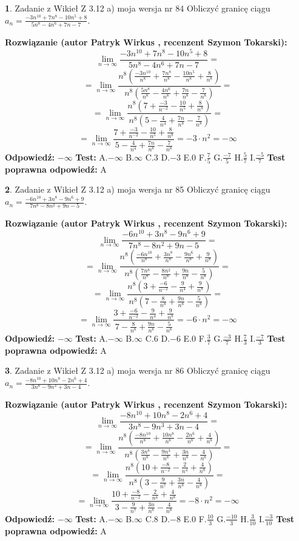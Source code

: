 \documentclass[12pt, a4paper]{article}
\theoremstyle{definition} %
\newtheorem{zad}{}
\newcommand{\zadStart}[1]{\begin{zad}#1\newline}
\newcommand{\zadStop}{\end{zad}}
\newcommand{\rozwStart}[2]{\noindent \textbf{Rozwiązanie (autor #1 , recenzent #2): }\newline}
\newcommand{\rozwStop}{\newline}
\newcommand{\odpStart}{\noindent \textbf{Odpowiedź:}\newline}
\newcommand{\odpStop}{\newline}
\newcommand{\testStart}{\noindent \textbf{Test:}\newline}
\newcommand{\testStop}{\newline}
\newcommand{\kluczStart}{\noindent \textbf{Test poprawna odpowiedź:}\newline}
\newcommand{\kluczStop}{\newline}
\begin{document}
\zadStart{Zadanie z Wikieł Z 3.12 a) moja wersja nr 84}
Obliczyć granicę ciągu $a_{n}=\frac{-3n^{10}+7n^{8}-10n^{5}+8}{5n^{8}-4n^{6}+7n-7}$.
\zadStop
\rozwStart{Patryk Wirkus}{Szymon Tokarski}
$$\lim\limits_{n\to\infty}\frac{-3n^{10}+7n^{8}-10n^{5}+8}{5n^{8}-4n^{6}+7n-7}=$$
$$=\lim\limits_{n\to\infty}\frac{n^{8}\left(\frac{-3n^{10}}{n^{8}}+\frac{7n^{8}}{n^{8}}-\frac{10n^{5}}{n^{8}}+\frac{8}{n^{8}}\right)}{n^{8}\left(\frac{5n^{8}}{n^{8}}-\frac{4n^{6}}{n^{8}}+\frac{7n}{n^{8}}-\frac{7}{n^{8}}\right)}=$$
$$=\lim\limits_{n\to\infty}\frac{n^{8}\left(7+\frac{-3}{n^{-2}}-\frac{10}{n^{5}}+\frac{8}{n^{8}}\right)}
{n^{8}\left(5-\frac{4}{n^{4}}+\frac{7n}{n^{8}}-\frac{7}{n^{8}}\right)}=$$
$$=\lim\limits_{n\to\infty}\frac{7+\frac{-3}{n^{-2}}-\frac{10}{n^{5}}+\frac{8}{n^{8}}}{5-\frac{4}{n^{4}}+\frac{7n}{n^{8}}-\frac{7}{n^{8}}}=-3\cdot n^{2} = -\infty$$
\rozwStop
\odpStart
$-\infty$
\odpStop
\testStart
A.$-\infty$
B.$\infty$
C.$3$
D.$-3$
E.$0$
F.$\frac{7}{5}$
G.$\frac{-7}{5}$
H.$\frac{5}{7}$
I.$\frac{-5}{7}$
\testStop
\kluczStart
A
\kluczStop



\zadStart{Zadanie z Wikieł Z 3.12 a) moja wersja nr 85}
Obliczyć granicę ciągu $a_{n}=\frac{-6n^{10}+3n^{8}-9n^{6}+9}{7n^{8}-8n^{2}+9n-5}$.
\zadStop
\rozwStart{Patryk Wirkus}{Szymon Tokarski}
$$\lim\limits_{n\to\infty}\frac{-6n^{10}+3n^{8}-9n^{6}+9}{7n^{8}-8n^{2}+9n-5}=$$
$$=\lim\limits_{n\to\infty}\frac{n^{8}\left(\frac{-6n^{10}}{n^{8}}+\frac{3n^{8}}{n^{8}}-\frac{9n^{6}}{n^{8}}+\frac{9}{n^{8}}\right)}{n^{8}\left(\frac{7n^{8}}{n^{8}}-\frac{8n^{2}}{n^{8}}+\frac{9n}{n^{8}}-\frac{5}{n^{8}}\right)}=$$
$$=\lim\limits_{n\to\infty}\frac{n^{8}\left(3+\frac{-6}{n^{-2}}-\frac{9}{n^{4}}+\frac{9}{n^{8}}\right)}
{n^{8}\left(7-\frac{8}{n^{8}}+\frac{9n}{n^{8}}-\frac{5}{n^{8}}\right)}=$$
$$=\lim\limits_{n\to\infty}\frac{3+\frac{-6}{n^{-2}}-\frac{9}{n^{4}}+\frac{9}{n^{8}}}{7-\frac{8}{n^{8}}+\frac{9n}{n^{8}}-\frac{5}{n^{8}}}=-6\cdot n^{2} = -\infty$$
\rozwStop
\odpStart
$-\infty$
\odpStop
\testStart
A.$-\infty$
B.$\infty$
C.$6$
D.$-6$
E.$0$
F.$\frac{3}{7}$
G.$\frac{-3}{7}$
H.$\frac{7}{3}$
I.$\frac{-7}{3}$
\testStop
\kluczStart
A
\kluczStop



\zadStart{Zadanie z Wikieł Z 3.12 a) moja wersja nr 86}
Obliczyć granicę ciągu $a_{n}=\frac{-8n^{10}+10n^{8}-2n^{6}+4}{3n^{8}-9n^{3}+3n-4}$.
\zadStop
\rozwStart{Patryk Wirkus}{Szymon Tokarski}
$$\lim\limits_{n\to\infty}\frac{-8n^{10}+10n^{8}-2n^{6}+4}{3n^{8}-9n^{3}+3n-4}=$$
$$=\lim\limits_{n\to\infty}\frac{n^{8}\left(\frac{-8n^{10}}{n^{8}}+\frac{10n^{8}}{n^{8}}-\frac{2n^{6}}{n^{8}}+\frac{4}{n^{8}}\right)}{n^{8}\left(\frac{3n^{8}}{n^{8}}-\frac{9n^{3}}{n^{8}}+\frac{3n}{n^{8}}-\frac{4}{n^{8}}\right)}=$$
$$=\lim\limits_{n\to\infty}\frac{n^{8}\left(10+\frac{-8}{n^{-2}}-\frac{2}{n^{4}}+\frac{4}{n^{8}}\right)}
{n^{8}\left(3-\frac{9}{n^{7}}+\frac{3n}{n^{8}}-\frac{4}{n^{8}}\right)}=$$
$$=\lim\limits_{n\to\infty}\frac{10+\frac{-8}{n^{-2}}-\frac{2}{n^{4}}+\frac{4}{n^{8}}}{3-\frac{9}{n^{7}}+\frac{3n}{n^{8}}-\frac{4}{n^{8}}}=-8\cdot n^{2} = -\infty$$
\rozwStop
\odpStart
$-\infty$
\odpStop
\testStart
A.$-\infty$
B.$\infty$
C.$8$
D.$-8$
E.$0$
F.$\frac{10}{3}$
G.$\frac{-10}{3}$
H.$\frac{3}{10}$
I.$\frac{-3}{10}$
\testStop
\kluczStart
A
\kluczStop
\end{document}
